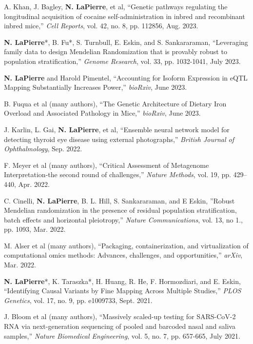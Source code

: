 \documentclass[margin, 10pt]{res} %
\begin{document}
\begin{resume}

A. Khan, J. Bagley, \textbf{N. LaPierre}, et al, ``Genetic pathways regulating the longitudinal acquisition of cocaine self-administration in inbred and recombinant inbred mice,'' \emph{Cell Reports}, vol. 42, no. 8, pp. 112856, Aug. 2023.  

\textbf{N. LaPierre}*, B. Fu*, S. Turnbull, E. Eskin, and S. Sankararaman, ``Leveraging family data to design Mendelian Randomization that is provably robust to population stratification,'' \emph{Genome Research}, vol. 33, pp. 1032-1041, July 2023.

\textbf{N. LaPierre} and Harold Pimentel, ``Accounting for Isoform Expression in eQTL Mapping Substantially Increases Power,'' \emph{bioRxiv}, June 2023.

B. Fuqua et al (many authors), ``The Genetic Architecture of Dietary Iron Overload and Associated Pathology in Mice,'' \emph{bioRxiv}, June 2023.

J. Karlin, L. Gai, \textbf{N. LaPierre}, et al, ``Ensemble neural network model for detecting thyroid eye disease using external photographs,'' \emph{British Journal of Ophthalmology}, Sep. 2022.

F. Meyer et al (many authors), ``Critical Assessment of Metagenome Interpretation-the second round of challenges,'' \emph{Nature Methods}, vol. 19, pp. 429–440, Apr. 2022.

C. Cinelli, \textbf{N. LaPierre}, B. L. Hill, S. Sankararaman, and E Eskin, ''Robust Mendelian randomization in the presence of residual population stratification, batch effects and horizontal pleiotropy,'' \emph{Nature Communications}, vol. 13, no 1., pp. 1093, Mar. 2022.

M. Alser et al (many authors), ``Packaging, containerization, and virtualization of computational omics methods: Advances, challenges, and opportunities,'' \emph{arXiv}, Mar. 2022.

\textbf{N. LaPierre}*, K. Taraszka*, H. Huang, R. He, F. Hormozdiari, and E. Eskin, ``Identifying Causal Variants by Fine Mapping Across Multiple Studies,'' \emph{PLOS Genetics}, vol. 17, no. 9, pp. e1009733, Sept. 2021.

J. Bloom et al (many authors), ``Massively scaled-up testing for SARS-CoV-2 RNA via next-generation sequencing of pooled and barcoded nasal and saliva samples,'' \emph{Nature Biomedical Engineering}, vol. 5, no. 7, pp. 657-665, July 2021.


\end{resume}
\end{document}
